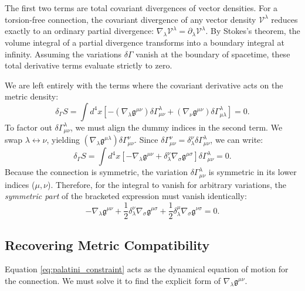 \documentclass[11pt, a4paper]{report}
\begin{document}
The first two terms are total covariant divergences of vector densities. For a torsion-free connection, the covariant divergence of any vector density $\mathcal{V}^{\lambda}$ reduces exactly to an ordinary partial divergence: $\nabla_{\lambda}\mathcal{V}^{\lambda} = \partial_{\lambda}\mathcal{V}^{\lambda}$. By Stokes's theorem, the volume integral of a partial divergence transforms into a boundary integral at infinity. Assuming the variations $\delta\Gamma$ vanish at the boundary of spacetime, these total derivative terms evaluate strictly to zero. 

We are left entirely with the terms where the covariant derivative acts on the metric density:
\begin{equation}
\delta_{\Gamma} S = \int d^{4}x \left[ - (\nabla_{\lambda}\mathfrak{g}^{\mu\nu})\delta\Gamma^{\lambda}_{\mu\nu} + (\nabla_{\nu}\mathfrak{g}^{\mu\nu})\delta\Gamma^{\lambda}_{\mu\lambda} \right] = 0.
\end{equation}
To factor out $\delta\Gamma^{\lambda}_{\mu\nu}$, we must align the dummy indices in the second term. We swap $\lambda \leftrightarrow \nu$, yielding $(\nabla_{\lambda}\mathfrak{g}^{\mu\lambda})\delta\Gamma^{\nu}_{\mu\nu}$. Since $\delta\Gamma^{\nu}_{\mu\nu} = \delta^{\nu}_{\lambda}\delta\Gamma^{\lambda}_{\mu\nu}$, we can write:
\begin{equation}
\delta_{\Gamma} S = \int d^{4}x \left[ - \nabla_{\lambda}\mathfrak{g}^{\mu\nu} + \delta^{\nu}_{\lambda} \nabla_{\sigma}\mathfrak{g}^{\mu\sigma} \right] \delta\Gamma^{\lambda}_{\mu\nu} = 0.
\end{equation}
Because the connection is symmetric, the variation $\delta\Gamma^{\lambda}_{\mu\nu}$ is symmetric in its lower indices ($\mu, \nu$). Therefore, for the integral to vanish for arbitrary variations, the \textit{symmetric part} of the bracketed expression must vanish identically:
\begin{equation}
\label{eq:palatini_constraint}
-\nabla_{\lambda}\mathfrak{g}^{\mu\nu} + \frac{1}{2}\delta^{\nu}_{\lambda} \nabla_{\sigma}\mathfrak{g}^{\mu\sigma} + \frac{1}{2}\delta^{\mu}_{\lambda} \nabla_{\sigma}\mathfrak{g}^{\nu\sigma} = 0.
\end{equation}

\subsection{Recovering Metric Compatibility}

Equation \eqref{eq:palatini_constraint} acts as the dynamical equation of motion for the connection. We must solve it to find the explicit form of $\nabla_{\lambda}\mathfrak{g}^{\mu\nu}$. 
\end{document}
